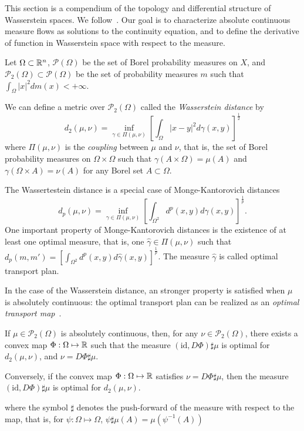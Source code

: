 This section is a compendium of the topology and differential structure of
Wasserstein spaces. We follow~\cite{cardaliaguet2010notes,ambrosio2005gradient,ambrosio2021lectures}.
Our goal is to characterize absolute continuous measure flows as solutions to the continuity equation,
and to define the derivative of function in Wasserstein space with respect to the measure.

Let $\Omega \subset \mathbb{R}^n$, $\mathcal{P}(\Omega)$ be the set of Borel
probability measures on $X$, and $\mathcal{P}_2(\Omega) \subset \mathcal{P}(\Omega)$
be the set of probability measures $m$ such that $\int_\Omega |x|^2 dm(x) < + \infty$.

We can define a metric over $\mathcal{P}_2(\Omega)$ called the 
\textit{Wasserstein distance} by
\begin{equation}\label{prob_measures:wasserstein_distance}
    d_2(\mu, \nu) = \inf_{\gamma \in \Pi(\mu,\nu)} \left[ \int_\Omega |x - y|^2 d\gamma(x,y) \right]^{\frac{1}{2}}
\end{equation}
where $\Pi(\mu,\nu)$ is the \textit{coupling} between $\mu$  and $\nu$,
that is, the set of Borel probability measures on $\Omega \times \Omega$
such that $\gamma(A \times \Omega) = \mu(A)$ and $\gamma(\Omega \times A) = \nu(A)$
for any Borel set $A \subset \Omega$.

The Wassertestein distance is a special case of Monge-Kantorovich distances
\begin{equation*}
    d_p(\mu, \nu) = \inf_{\gamma \in \Pi(\mu, \nu)} \left[ \int_{\Omega^2} d^p(x,y) d\gamma(x,y)  \right]^{\frac{1}{p}}.
\end{equation*}
One important property of Monge-Kantorovich distances is the existence of at least
one optimal measure, that is, one $\hat  \gamma \in \Pi(\mu,\nu)$ such that
$d_p(m,m') = \left[ \int_{\Omega^2} d^p(x,y) d {\hat \gamma}(x,y) \right]^{\frac{1}{p}}$.
The measure $\hat \gamma$ is called optimal transport plan.

In the case of the Wasserstein distance, an stronger property is satisfied when 
$\mu$ is absolutely continuous: the optimal transport plan can be realized as
an \textit{optimal transport map}~\cite{cardaliaguet2010notes}.
\begin{theorem}
    If $\mu \in \mathcal{P}_2(\Omega)$ is absolutely continuous, then,
    for any $\nu \in \mathcal{P}_2(\Omega)$, there exists a convex map 
    $\Phi: \Omega \mapsto \mathbb{R} $ such that the measure
    $ (\text{id}, D\Phi)\sharp \mu $ is optimal for $d_2(\mu, \nu)$, and $\nu = D \Phi \sharp \mu$.

    Conversely, if the convex map $\Phi : \Omega \mapsto \mathbb{R}$ satisfies $\nu = D \Phi \sharp \mu$,
    then the measure $(\text{id}, D\Phi)\sharp \mu$ is optimal for $d_ 2(\mu,\nu)$.
\end{theorem}
where the symbol $\sharp$ denotes the push-forward of the measure with respect to the map,
that is, for $\psi : \Omega \mapsto \Omega$, $\psi \sharp \mu(A) = \mu(\psi^{-1}(A))$

